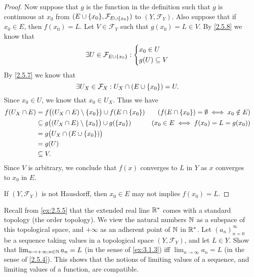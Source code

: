 \begin{proof}
  Now suppose that \(g\) is the function in the definition such that \(g\) is continuous at \(x_0\) from \((E \cup \set{x_0}, \mathcal{F}_{E \cup \set{x_0}})\) to \((Y, \mathcal{F}_Y)\).
  Also suppose that if \(x_0 \in E\), then \(f(x_0) = L\).
  Let \(V \in \mathcal{F}_Y\) such that \(g(x_0) = L \in V\).
  By \cref{2.5.8} we know that
  \[
    \exists U \in \mathcal{F}_{E \cup \left\lbrace x_0\right\rbrace} : \begin{dcases}
      x_0 \in U \\
      g(U) \subseteq V
    \end{dcases}
  \]
  By \cref{2.5.7} we know that
  \[
    \exists U_X \in \mathcal{F}_X : U_X \cap (E \cup \left\lbrace x_0\right\rbrace) = U.
  \]
  Since \(x_0 \in U\), we know that \(x_0 \in U_X\).
  Thus we have
  \begin{align*}
    f(U_X \cap E) & = f\big((U_X \cap E) \setminus \set{x_0}\big) \cup f(E \cap \set{x_0})  & (f(E \cap \set{x_0}) = \emptyset \iff x_0 \notin E) \\
                  & \subseteq g\big((U_X \cap E) \setminus \set{x_0}\big) \cup g(\set{x_0}) & (x_0 \in E \iff f(x_0) = L = g(x_0))                \\
                  & = g\big(U_X \cap (E \cup \set{x_0})\big)                                                                                      \\
                  & = g(U)                                                                                                                        \\
                  & \subseteq V.
  \end{align*}
  Since \(V\) is arbitrary, we conclude that \(f(x)\) converges to \(L\) in \(Y\) as \(x\) converges to \(x_0\) in \(E\).

  If \((Y, \mathcal{F}_Y)\) is not Hausdorff, then \(x_0 \in E\) may not implies \(f(x_0) = L\).
\end{proof}

\begin{ex}\label{ex:3.1.4}
  Recall from \cref{ex:2.5.5} that the extended real line \(\mathbb{R}^*\) comes with a standard topology (the order topology).
  We view the natural numbers \(\mathbb{N}\) as a subspace of this topological space, and \(+\infty\) as an adherent point of \(\mathbb{N}\) in \(\mathbb{R}^*\).
  Let \((a_n)_{n = 0}^\infty\) be a sequence taking values in a topological space \((Y, \mathcal{F}_Y)\), and let \(L \in Y\).
  Show that \(\lim_{n \to +\infty ; n \in \mathbb{N}} a_n = L\) (in the sense of \cref{ex:3.1.3}) iff \(\lim_{n \to \infty} a_n = L\) (in the sense of \cref{2.5.4}).
  This shows that the notions of limiting values of a sequence, and limiting values of a function, are compatible.
\end{ex}

